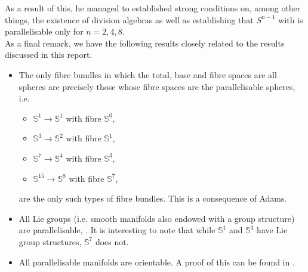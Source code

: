 \documentclass[12pt,a4paper]{article}
\begin{document}
As a result of this, he managed to established strong conditions on, among other things, the existence of division algebras as well as establishing that $S^{n-1}$ with is parallelisable only for $n=2,4,8$.\\

As a final remark, we have the following results closely related to the results discussed in this report.
\begin{itemize}
\item The only fibre bundles in which the total, base and fibre spaces are all spheres are precisely those whose fibre spaces are the parallelisable spheres, i.e.
\begin{itemize}
\item $\mathbb{S}^1\to\mathbb{S}^1$ with fibre $\mathbb{S}^0$,
\item $\mathbb{S}^3\to\mathbb{S}^2$ with fibre $\mathbb{S}^1$,
\item $\mathbb{S}^7\to\mathbb{S}^4$ with fibre $\mathbb{S}^3$,
\item $\mathbb{S}^{15}\to\mathbb{S}^8$ with fibre $\mathbb{S}^7$,
\end{itemize} 
are the only such types of fibre bundles. This is a consequence of Adams.
\item All Lie groups (i.e. smooth manifolds also endowed with a group structure) are parallelisable, \cite{MR2954043}. It is interesting to note that while $\mathbb{S}^1$ and $\mathbb{S}^3$ have Lie group structures, $\mathbb{S}^7$ does not.
\item All parallelisable manifolds are orientable. A proof of this can be found in \cite{MR2954043}.
\end{itemize} 

%
%
%
%
%
\pagebreak
\end{document}
